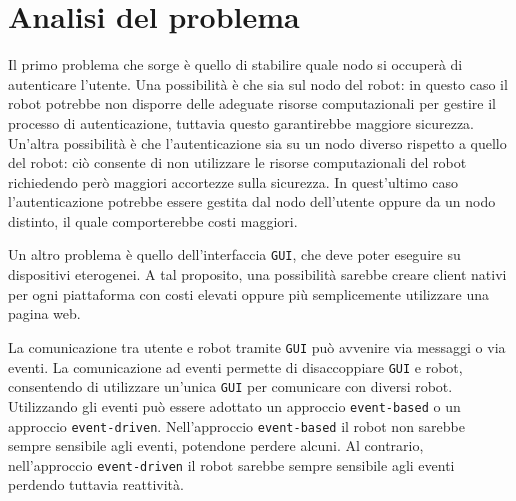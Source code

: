 \documentclass{llncs}
\newcommand{\action}[1]{\texttt{#1}\xspace}
\newcommand{\code}[1]{{\color{blue}\small{\texttt{#1}}}}
\newcommand{\labelsec}[1]{\label{sec:#1}}
\begin{document}




%
\section{Analisi del problema}
\labelsec{ProblemAnalysis}
Il primo problema che sorge è quello di stabilire quale nodo si occuperà di autenticare l'utente. Una possibilità è che sia sul nodo del robot: in questo caso il robot potrebbe non disporre delle adeguate risorse computazionali per gestire il processo di autenticazione, tuttavia questo garantirebbe maggiore sicurezza. Un'altra possibilità è che l'autenticazione sia su un nodo diverso rispetto a quello del robot: ciò consente di non utilizzare le risorse computazionali del robot richiedendo però maggiori accortezze sulla sicurezza. In quest'ultimo caso l'autenticazione potrebbe essere gestita dal nodo dell'utente oppure da un nodo distinto, il quale comporterebbe costi maggiori.

Un altro problema è quello dell'interfaccia \action{GUI}, che deve poter eseguire su dispositivi eterogenei. A tal proposito, una possibilità sarebbe creare client nativi per ogni piattaforma con costi elevati oppure più semplicemente utilizzare una pagina web. 

La comunicazione tra utente e robot tramite \action{GUI} può avvenire via messaggi o via eventi. La comunicazione ad eventi permette di disaccoppiare \action{GUI} e robot, consentendo di utilizzare un'unica \action{GUI} per comunicare con diversi robot. Utilizzando gli eventi può essere adottato un approccio \code{event-based} o un approccio \code{event-driven}. Nell'approccio \code{event-based} il robot non sarebbe sempre sensibile agli eventi, potendone perdere alcuni. Al contrario, nell'approccio \code{event-driven} il robot sarebbe sempre sensibile agli eventi perdendo tuttavia reattività.
\\



\end{document}
